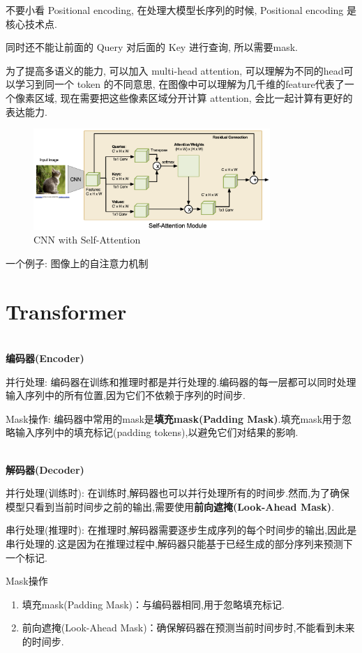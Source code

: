 不要小看 Positional encoding, 在处理大模型长序列的时候, Positional encoding 是核心技术点.

同时还不能让前面的 Query 对后面的 Key 进行查询, 所以需要mask.

为了提高多语义的能力, 可以加入 multi-head attention, 可以理解为不同的head可以学习到同一个 token 的不同意思,
在图像中可以理解为几千维的feature代表了一个像素区域, 现在需要把这些像素区域分开计算 attention, 会比一起计算有更好的表达能力.

\begin{figure}[H]
    \centering
    \includegraphics[width=0.8\textwidth]{figures/image_self_atten.png}
    \caption{CNN with Self-Attention}
    \label{fig:image_self_atten}
\end{figure}

一个例子: 图像上的自注意力机制

\section{Transformer}

\textbf{\\编码器(Encoder)}

并行处理:
编码器在训练和推理时都是并行处理的.编码器的每一层都可以同时处理输入序列中的所有位置,因为它们不依赖于序列的时间步.

Mask操作:
编码器中常用的mask是\textbf{填充mask(Padding Mask)}.填充mask用于忽略输入序列中的填充标记(padding tokens),以避免它们对结果的影响.

\textbf{\\解码器(Decoder)}

并行处理(训练时):
在训练时,解码器也可以并行处理所有的时间步.然而,为了确保模型只看到当前时间步之前的输出,需要使用\textbf{前向遮掩(Look-Ahead Mask)}.

串行处理(推理时):
在推理时,解码器需要逐步生成序列的每个时间步的输出,因此是串行处理的.这是因为在推理过程中,解码器只能基于已经生成的部分序列来预测下一个标记.

Mask操作
\begin{enumerate}
    \item 填充mask(Padding Mask)：与编码器相同,用于忽略填充标记.
    \item 前向遮掩(Look-Ahead Mask)：确保解码器在预测当前时间步时,不能看到未来的时间步.
\end{enumerate}

